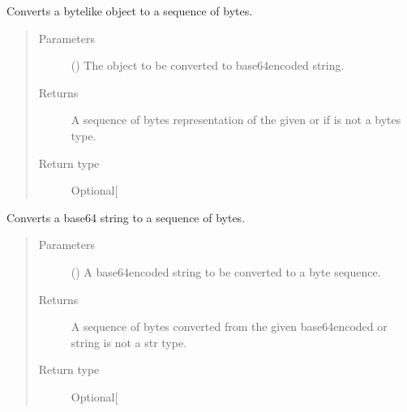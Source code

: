 \documentclass[letterpaper,10pt,english]{sphinxmanual}
\begin{document}
\begin{fulllineitems}
\label{\detokenize{app.utils:app.utils.convertions.base64_bytelike_obj_to_bytes}}
Converts a byte\sphinxhyphen{}like object to a sequence of bytes.
\begin{quote}\begin{description}
\item[{Parameters}] \leavevmode
{} () \textendash{} The object to be converted to base64\sphinxhyphen{}encoded string.

\item[{Returns}] \leavevmode
A sequence of bytes representation of the given  or 
if  is not a bytes type.

\item[{Return type}] \leavevmode
Optional{[}\sphinxhref{https://docs.python.org/3.7/library/stdtypes.html\#bytes}{bytes}{]}

\end{description}\end{quote}

\end{fulllineitems}


\begin{fulllineitems}
\label{\detokenize{app.utils:app.utils.convertions.base64_string_to_bytes}}
Converts a base64 string to a sequence of bytes.
\begin{quote}\begin{description}
\item[{Parameters}] \leavevmode
{} () \textendash{} A base64\sphinxhyphen{}encoded string to be converted to a byte sequence.

\item[{Returns}] \leavevmode
A sequence of bytes converted from the given base64\sphinxhyphen{}encoded 
or  string is not a str type.

\item[{Return type}] \leavevmode
Optional{[}\sphinxhref{https://docs.python.org/3.7/library/stdtypes.html\#bytes}{bytes}{]}

\end{description}\end{quote}

\end{fulllineitems}
\end{document}
